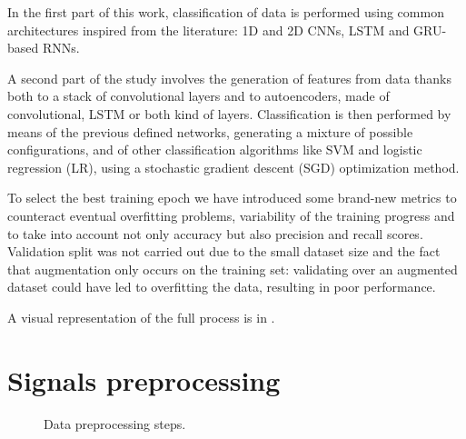 In the first part of this work, classification of data is performed using common architectures inspired from the literature: 1D and 2D CNNs, LSTM and GRU-based RNNs.

A second part of the study involves the generation of features from data thanks both to a stack of convolutional layers and to autoencoders, made of convolutional, LSTM or both kind of layers. Classification is then performed by means of the previous defined networks, generating a mixture of possible configurations, and of other classification algorithms like SVM and logistic regression (LR), using a stochastic gradient descent (SGD) optimization method.

To select the best training epoch we have introduced some brand-new metrics to counteract eventual overfitting problems, variability of the training progress and to take into account not only accuracy but also precision and recall scores.
Validation split was not carried out due to the small dataset size and the fact that augmentation only occurs on the training set: validating over an augmented dataset could have led to overfitting the data, resulting in poor performance.

A visual representation of the full process is in .

\section{Signals preprocessing}\label{sec:model}

\begin{figure}
\begin{center}
  \vspace{22mm}

    \caption{Data preprocessing steps.}
    \label{fig:preprocessing}
\end{center}
\end{figure}

